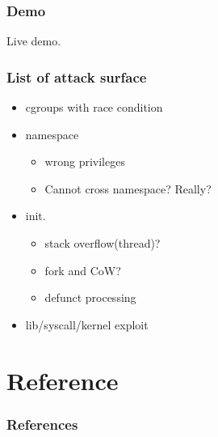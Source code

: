 \documentclass{beamer}
\begin{document}
\begin{frame}
    \frametitle{Demo}
    \centering Live demo.
\end{frame}

\begin{frame}
    \frametitle{List of attack surface}
    \begin{itemize}
        \item cgroups with race condition
        \item namespace
              \begin{itemize}
                  \item wrong privileges
                  \item Cannot cross namespace? Really?
              \end{itemize}
        \item init.
              \begin{itemize}
                  \item stack overflow(thread)?
                  \item fork and CoW?
                  \item defunct processing
              \end{itemize}
        \item lib/syscall/kernel exploit
    \end{itemize}
\end{frame}

\section{Reference}
\begin{frame}[t, allowframebreaks]
    \frametitle{References}
    \printbibliography
\end{frame}
\end{document}
